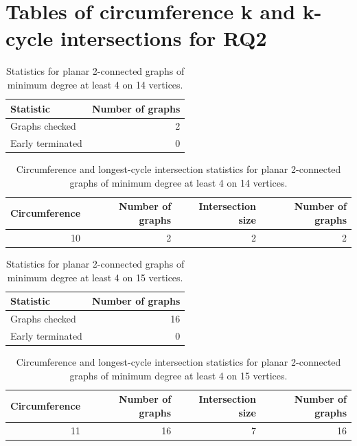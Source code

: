 \chapter{Tables of circumference k and k-cycle intersections for RQ2}
\label{app:rq2}

\begin{table}[ht]
\centering
\caption{Statistics for planar 2-connected graphs of minimum degree at least 4 on 14 vertices.}
\label{tab:summary-min4-n14}
\begin{tabular}{lr}
\toprule
Statistic & Number of graphs \\
\midrule
Graphs checked & 2 \\
Early terminated & 0 \\
\bottomrule
\end{tabular}
\end{table}


\begin{table}[ht]
\centering
\caption{Circumference and longest-cycle intersection statistics for planar 2-connected graphs of minimum degree at least 4 on 14 vertices.}
\label{tab:circ-intersection-min4-n14}
\begin{tabular}{rrrr}
\toprule
Circumference & Number of graphs & Intersection size & Number of graphs \\
\midrule
10 & 2 & 2 & 2 \\
\bottomrule
\end{tabular}
\end{table}

\begin{table}[ht]
\centering
\caption{Statistics for planar 2-connected graphs of minimum degree at least 4 on 15 vertices.}
\label{tab:summary-min4-n15}
\begin{tabular}{lr}
\toprule
Statistic & Number of graphs \\
\midrule
Graphs checked & 16 \\
Early terminated & 0 \\
\bottomrule
\end{tabular}
\end{table}


\begin{table}[ht]
\centering
\caption{Circumference and longest-cycle intersection statistics for planar 2-connected graphs of minimum degree at least 4 on 15 vertices.}
\label{tab:circ-intersection-min4-n15}
\begin{tabular}{rrrr}
\toprule
Circumference & Number of graphs & Intersection size & Number of graphs \\
\midrule
11 & 16 & 7 & 16 \\
\bottomrule
\end{tabular}
\end{table}

